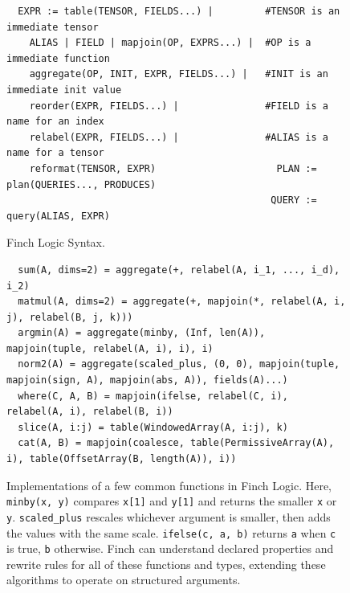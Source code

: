 
\begin{figure}
  \scriptsize
  \vspace{-12pt}
\begin{verbatim}
  EXPR := table(TENSOR, FIELDS...) |         #TENSOR is an immediate tensor
    ALIAS | FIELD | mapjoin(OP, EXPRS...) |  #OP is a immediate function
    aggregate(OP, INIT, EXPR, FIELDS...) |   #INIT is an immediate init value
    reorder(EXPR, FIELDS...) |               #FIELD is a name for an index
    relabel(EXPR, FIELDS...) |               #ALIAS is a name for a tensor
    reformat(TENSOR, EXPR)                     PLAN := plan(QUERIES..., PRODUCES)
                                              QUERY := query(ALIAS, EXPR)
\end{verbatim}
\vspace{-12pt}
\caption{\scriptsize Finch Logic Syntax. }\label{fig:finch_logic_syntax}
\begin{verbatim}
  sum(A, dims=2) = aggregate(+, relabel(A, i_1, ..., i_d), i_2)
  matmul(A, dims=2) = aggregate(+, mapjoin(*, relabel(A, i, j), relabel(B, j, k)))
  argmin(A) = aggregate(minby, (Inf, len(A)), mapjoin(tuple, relabel(A, i), i), i)
  norm2(A) = aggregate(scaled_plus, (0, 0), mapjoin(tuple, mapjoin(sign, A), mapjoin(abs, A)), fields(A)...)
  where(C, A, B) = mapjoin(ifelse, relabel(C, i), relabel(A, i), relabel(B, i))
  slice(A, i:j) = table(WindowedArray(A, i:j), k)
  cat(A, B) = mapjoin(coalesce, table(PermissiveArray(A), i), table(OffsetArray(B, length(A)), i))
\end{verbatim}
\vspace{-12pt}
\caption{\scriptsize Implementations of a few common functions in Finch Logic. Here, \texttt{minby(x, y)} compares \texttt{x[1]} and \texttt{y[1]} and returns the smaller \texttt{x} or \texttt{y}. \texttt{scaled\_plus} rescales whichever argument is smaller, then adds the values with the same scale. \texttt{ifelse(c, a, b)} returns \texttt{a} when \texttt{c} is true,  \texttt{b} otherwise. Finch can understand declared properties and rewrite rules for all of these functions and types, extending these algorithms to operate on structured arguments.} \label{fig:api_extensible}
\vspace{-18pt}
\end{figure}
